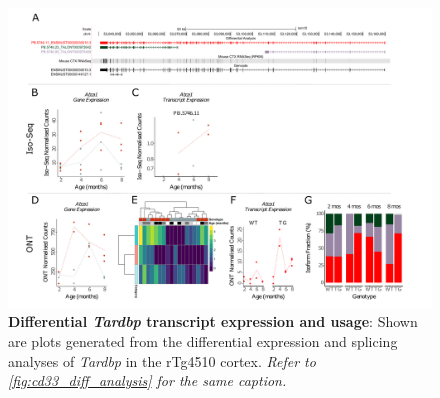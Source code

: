 \begin{landscape}
	\begin{figure}[htp]
		\begin{center}
			\includegraphics[page=17,trim={0 0.5cm 0 1.5cm},scale =0.85]{Figures/TargetGene_DifferentialAnalysis.pdf}
		\end{center}
		\captionsetup{width=1.5\textwidth}
		\caption[Differential \textit{Tardbp} transcript expression and usage]%
		{\textbf{Differential \textit{Tardbp} transcript expression and usage}: Shown are plots generated from the differential expression and splicing analyses of \textit{Tardbp} in the rTg4510 cortex. \textit{Refer to \cref{fig:cd33_diff_analysis} for the same caption.}}   
		\label{fig:Tardbp_diff_analysis}
	\end{figure}
\end{landscape}


